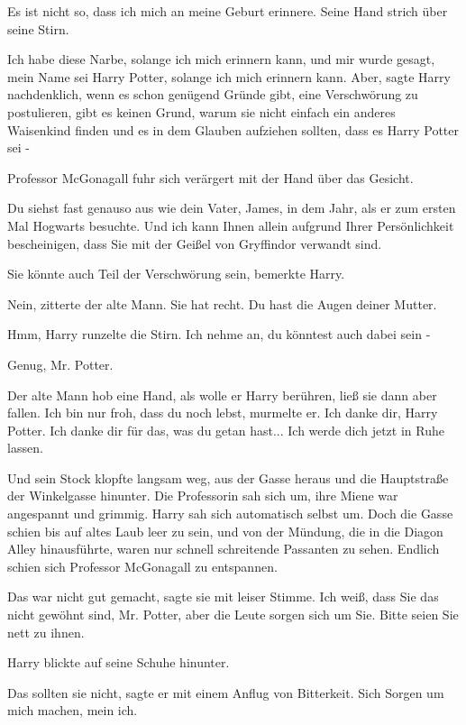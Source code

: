 \glqq{}Es ist nicht so, dass ich mich an meine Geburt erinnere.\grqq{} Seine Hand
strich über seine Stirn.

\glqq{}Ich habe diese Narbe, solange ich mich erinnern kann, und mir wurde
gesagt, mein Name sei Harry Potter, solange ich mich erinnern kann. Aber\grqq{},
sagte Harry nachdenklich, \glqq{}wenn es schon genügend Gründe gibt, eine
Verschwörung zu postulieren, gibt es keinen Grund, warum sie nicht einfach ein
anderes Waisenkind finden und es in dem Glauben aufziehen sollten, dass es Harry
Potter sei -\grqq{}

Professor McGonagall fuhr sich verärgert mit der Hand über das Gesicht.

\glqq{}Du siehst fast genauso aus wie dein Vater, James, in dem Jahr, als er zum
ersten Mal Hogwarts besuchte. Und ich kann Ihnen allein aufgrund Ihrer
Persönlichkeit bescheinigen, dass Sie mit der Geißel von Gryffindor verwandt
sind.\grqq{}

\glqq{}Sie könnte auch Teil der Verschwörung sein\grqq{}, bemerkte Harry.

\glqq{}Nein\grqq{}, zitterte der alte Mann. \glqq{}Sie hat recht. Du hast die
Augen deiner Mutter.\grqq{}

\glqq{}Hmm\grqq{}, Harry runzelte die Stirn. \glqq{}Ich nehme an, du könntest auch
dabei sein -\grqq{}

\glqq{}Genug, Mr. Potter.\grqq{}

Der alte Mann hob eine Hand, als wolle er Harry berühren, ließ sie dann aber
fallen. \glqq{}Ich bin nur froh, dass du noch lebst\grqq{}, murmelte er. \glqq
Ich danke dir, Harry Potter. Ich danke dir für das, was du getan hast... Ich
werde dich jetzt in Ruhe lassen.\grqq{}

Und sein Stock klopfte langsam weg, aus der Gasse heraus und die Hauptstraße der
Winkelgasse hinunter. Die Professorin sah sich um, ihre Miene war angespannt und
grimmig. Harry sah sich automatisch selbst um. Doch die Gasse schien bis auf
altes Laub leer zu sein, und von der Mündung, die in die Diagon Alley
hinausführte, waren nur schnell schreitende Passanten zu sehen. Endlich schien
sich Professor McGonagall zu entspannen.

\glqq{}Das war nicht gut gemacht\grqq{}, sagte sie mit leiser Stimme. \glqq{}Ich
weiß, dass Sie das nicht gewöhnt sind, Mr. Potter, aber die Leute sorgen sich um
Sie. Bitte seien Sie nett zu ihnen.\grqq{}

Harry blickte auf seine Schuhe hinunter.

\glqq{}Das sollten sie nicht\grqq{}, sagte er mit einem Anflug von Bitterkeit.
\glqq{}Sich Sorgen um mich machen, mein ich.\grqq{}

